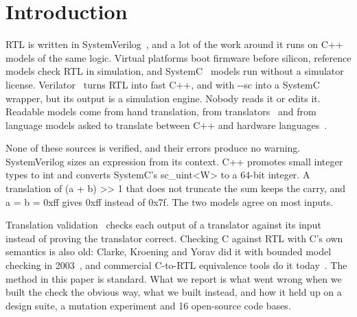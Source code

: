 \documentclass[conference]{IEEEtran}
\newcommand{\code}[1]{{\fontshape{n}\ttfamily #1}}
\begin{document}
\section{Introduction}
\label{sec:intro}

RTL is written in SystemVerilog~\cite{ieee1800_2023}, and a lot of the work around it runs on
C++ models of the same logic. Virtual platforms boot firmware before silicon, reference models
check RTL in simulation, and SystemC~\cite{ieee1666_2023} models run without a simulator license.
Verilator~\cite{snyder2020verilator} turns RTL into fast C++, and with \code{-{}-sc} into a SystemC
wrapper, but its output is a simulation engine. Nobody reads it or edits it. Readable models come
from hand translation, from translators~\cite{bombieri2010hifsuite,syed2013vhdl2sc,zheng2026bidir}
and from language models asked to translate between C++ and hardware
languages~\cite{collini2024c2hlsc,lyu2026autoc2v}.

None of these sources is verified, and their errors produce no warning. SystemVerilog sizes an
expression from its context. C++ promotes small integer types to \code{int} and converts SystemC's
\code{sc\_uint<W>} to a 64-bit integer. A translation of \code{(a + b) >> 1} that does not truncate
the sum keeps the carry, and \code{a = b = 0xff} gives \code{0xff} instead of \code{0x7f}. The
two models agree on most inputs.

Translation validation~\cite{pnueli1998tv,necula2000tv,lopes2021alive2} checks each output of a
translator against its input instead of proving the translator correct. Checking C against RTL
with C's own semantics is also old: Clarke, Kroening and Yorav did it with bounded model checking
in 2003~\cite{clarke2003cverilog}, and commercial C-to-RTL equivalence tools do it
today~\cite{koelbl2009c2rtl}. The method in this paper is standard. What we report is what went
wrong when we built the check the obvious way, what we built instead, and how it held up on a
design suite, a mutation experiment and 16 open-source code bases.
\end{document}
